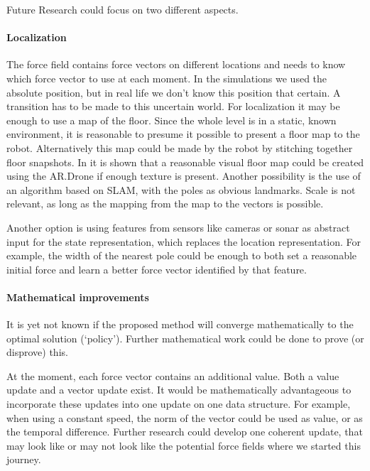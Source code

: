 \documentclass[11pt]{article}
\begin{document}
Future Research could focus on two different aspects.

\paragraph{Localization}

The force field contains force vectors on different locations and needs to know which force vector to use at each moment. In the simulations we used the absolute position, but in real life we don't know this position that certain. A transition has to be made to this uncertain world. For localization it may be enough to use a map of the floor. Since the whole level is in a static, known environment, it is reasonable to presume it possible to present a floor map to the robot. Alternatively this map could be made by the robot by stitching together floor snapshots. In \cite{nick} it is shown that a reasonable visual floor map could be created using the AR.Drone if enough texture is present. Another possibility is the use of an algorithm based on SLAM, with the poles as obvious landmarks. Scale is not relevant, as long as the mapping from the map to the vectors is possible.

Another option is using features from sensors like cameras or sonar as abstract input for the state representation, which replaces the location representation. For example, the width of the nearest pole could be enough to both set a reasonable initial force and learn a better force vector identified by that feature.


\paragraph{Mathematical improvements}

It is yet not known if the proposed method will converge mathematically to the optimal solution (`policy'). Further mathematical work could be done to prove (or disprove) this.

At the moment, each force vector contains an additional value. Both a value update and a vector update exist. It would be mathematically advantageous to incorporate these updates into one update on one data structure. For example, when using a constant speed, the norm of the vector could be used as value, or as the temporal difference. Further research could develop one coherent update, that may look like or may not look like the potential force fields where we started this journey.




\end{document}
